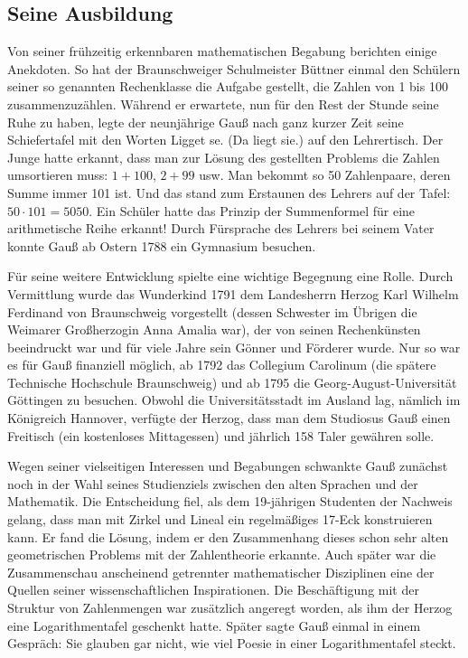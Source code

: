 \documentclass[10pt]{article}
\begin{document}
\subsection{Seine Ausbildung}

Von seiner frühzeitig erkennbaren mathematischen Begabung berichten einige
Anekdoten. So hat der Braunschweiger Schulmeister Büttner einmal den Schülern
seiner so genannten Rechenklasse die Aufgabe gestellt, die Zahlen von 1 bis
100 zusammenzuzählen. Während er erwartete, nun für den Rest der Stunde seine
Ruhe zu haben, legte der neunjährige Gauß nach ganz kurzer Zeit seine
Schiefertafel mit den Worten {\glqq}Ligget se.{\grqq} ({\glqq}Da liegt
sie.{\grqq}) auf den Lehrertisch. Der Junge hatte erkannt, dass man zur Lösung
des gestellten Problems die Zahlen umsortieren muss: $1+100$, $2+99$ usw. Man
bekommt so 50 Zahlenpaare, deren Summe immer 101 ist. Und das stand zum
Erstaunen des Lehrers auf der Tafel: $50\cdot 101 = 5050$. Ein Schüler hatte
das Prinzip der Summenformel für eine arithmetische Reihe erkannt! Durch
Fürsprache des Lehrers bei seinem Vater konnte Gauß ab Ostern 1788 ein
Gymnasium besuchen.

Für seine weitere Entwicklung spielte eine wichtige Begegnung eine
Rolle. Durch Vermittlung wurde das {\glqq}Wunderkind{\grqq} 1791 dem
Landesherrn Herzog Karl Wilhelm Ferdinand von Braunschweig vorgestellt (dessen
Schwester im Übrigen die Weimarer Großherzogin Anna Amalia war), der von
seinen Rechenkünsten beeindruckt war und für viele Jahre sein Gönner und
Förderer wurde. Nur so war es für Gauß finanziell möglich, ab 1792 das
Collegium Carolinum (die spätere Technische Hochschule Braunschweig) und ab
1795 die Georg-August-Universität Göttingen zu besuchen. Obwohl die
Universitätsstadt im {\glqq}Ausland{\grqq} lag, nämlich im Königreich
Hannover, verfügte der Herzog, dass man dem Studiosus Gauß einen Freitisch
(ein kostenloses Mittagessen) und jährlich 158 Taler gewähren solle.

Wegen seiner vielseitigen Interessen und Begabungen schwankte Gauß zunächst
noch in der Wahl seines Studienziels zwischen den alten Sprachen und der
Mathematik. Die Entscheidung fiel, als dem 19-jährigen Studenten der Nachweis
gelang, dass man mit Zirkel und Lineal ein regelmäßiges 17-Eck konstruieren
kann. Er fand die Lösung, indem er den Zusammenhang dieses schon sehr alten
geometrischen Problems mit der Zahlentheorie erkannte. Auch später war die
Zusammenschau anscheinend getrennter mathematischer Disziplinen eine der
Quellen seiner wissenschaftlichen Inspirationen. Die Beschäftigung mit der
Struktur von Zahlenmengen war zusätzlich angeregt worden, als ihm der Herzog
eine Logarithmentafel geschenkt hatte. Später sagte Gauß einmal in einem
Gespräch: {\glqq}Sie glauben gar nicht, wie viel Poesie in einer
Logarithmentafel steckt.{\grqq}
\end{document}
